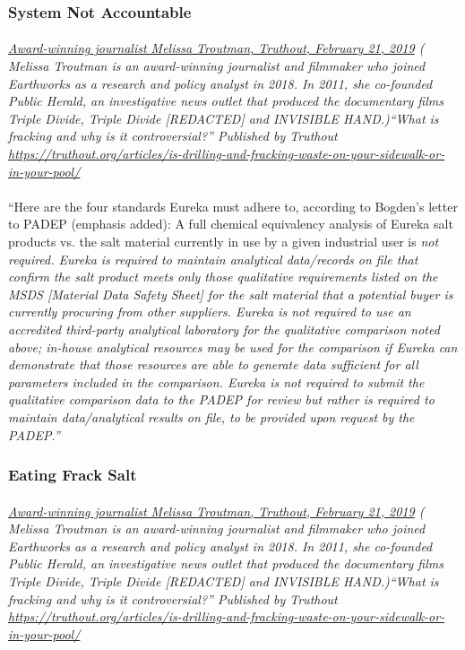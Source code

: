 \documentclass{article}
\begin{document}
\subsubsection{System Not Accountable}
\paragraph{}
\small
\textit{
\underline{Award-winning journalist Melissa Troutman, Truthout, February 21, 2019}
( Melissa Troutman is an award-winning journalist and filmmaker who joined Earthworks as a research and policy analyst in 2018. In 2011, she co-founded Public Herald, an investigative news outlet that produced the documentary films Triple Divide, Triple Divide [REDACTED] and INVISIBLE HAND.)``What is fracking and why is it controversial?'' Published by Truthout
\url{https://truthout.org/articles/is-drilling-and-fracking-waste-on-your-sidewalk-or-in-your-pool/}}
\normalsize
\paragraph{}
``Here are the four standards Eureka must adhere to, according to Bogden’s letter to PADEP (emphasis added):
A full chemical equivalency analysis of Eureka salt products vs. the salt material currently in use by a given industrial user is \em not required\em. Eureka is required to maintain analytical data/records on file that confirm the salt product meets \em only \em those qualitative requirements listed on the MSDS [Material Data Safety Sheet] for the salt material that a potential buyer is currently procuring from other suppliers. Eureka is \em not required \em to use an accredited third-party analytical laboratory for the qualitative comparison noted above; in-house analytical resources may be used for the comparison if Eureka can demonstrate that those resources are able to generate data sufficient for all parameters included in the comparison. Eureka is \em not required \em to submit the qualitative comparison data to the PADEP for review but rather is required to maintain data/analytical results on file, to be provided upon request by the PADEP.”

\subsubsection{Eating Frack Salt}
\paragraph{}
\small
\textit{
\underline{Award-winning journalist Melissa Troutman, Truthout, February 21, 2019}
( Melissa Troutman is an award-winning journalist and filmmaker who joined Earthworks as a research and policy analyst in 2018. In 2011, she co-founded Public Herald, an investigative news outlet that produced the documentary films Triple Divide, Triple Divide [REDACTED] and INVISIBLE HAND.)``What is fracking and why is it controversial?'' Published by Truthout
\url{https://truthout.org/articles/is-drilling-and-fracking-waste-on-your-sidewalk-or-in-your-pool/}}
\normalsize
\end{document}

